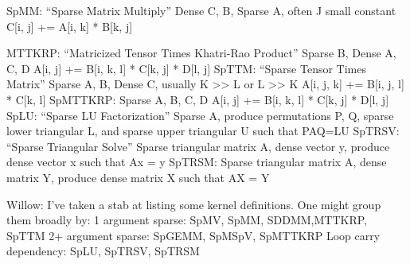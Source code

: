 \documentclass{article}
\begin{document}
SpMM:
	“Sparse Matrix Multiply”
Dense C, B, Sparse A, often J small constant
C[i, j] += A[i, k] * B[k, j]

MTTKRP:
	“Matricized Tensor Times Khatri-Rao Product”
Sparse B, Dense A, C, D
A[i, j] += B[i, k, l] * C[k, j] * D[l, j]
SpTTM:
	“Sparse Tensor Times Matrix”
Sparse A, B, Dense C, usually K >> L or L >> K
A[i, j, k] += B[i, j, l] * C[k, l]
SpMTTKRP:
Sparse A, B, C, D
A[i, j] += B[i, k, l] * C[k, j] * D[l, j]
SpLU:
	“Sparse LU Factorization”
Sparse A, produce permutations P, Q, sparse lower triangular L, and sparse upper triangular U
such that PAQ=LU
SpTRSV:
	“Sparse Triangular Solve”
	Sparse triangular matrix A, dense vector y, produce dense vector x such that Ax = y
SpTRSM:
	Sparse triangular matrix A, dense matrix Y, produce dense matrix X such that AX = Y

Willow: I’ve taken a stab at listing some kernel definitions. One might group them broadly by:
	1 argument sparse: SpMV, SpMM, SDDMM,MTTKRP, SpTTM
	2+ argument sparse: SpGEMM, SpMSpV, SpMTTKRP
	Loop carry dependency: SpLU, SpTRSV, SpTRSM

	
\end{document}
